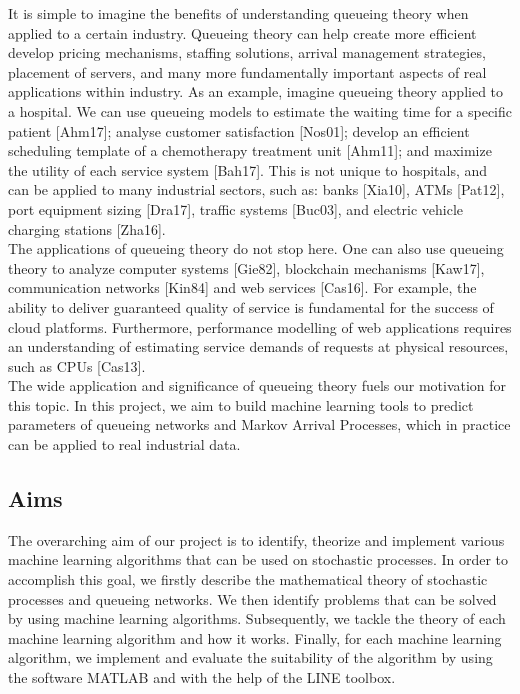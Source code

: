 \documentclass[a4paper,11pt,titlepage]{article}
\begin{document}
It is simple to imagine the benefits of understanding queueing theory when applied to a certain industry. Queueing theory can help create more efficient develop pricing mechanisms, staffing solutions, arrival management strategies, placement of servers, and many more fundamentally important aspects of real applications within industry. As an example, imagine queueing theory applied to a hospital. We can use queueing models to estimate the waiting time for a specific patient [Ahm17]; analyse customer satisfaction [Nos01]; develop an efficient scheduling template of a chemotherapy treatment unit [Ahm11]; and maximize the utility of each service system [Bah17]. This is not unique to hospitals, and can be applied to many industrial sectors, such as: banks [Xia10], ATMs [Pat12], port equipment sizing [Dra17], traffic systems [Buc03], and electric vehicle charging stations [Zha16]. \\

The applications of queueing theory do not stop here. One can also use queueing theory to analyze computer systems [Gie82], blockchain mechanisms [Kaw17], communication networks [Kin84] and web services [Cas16]. For example, the ability to deliver guaranteed quality of service is fundamental for the success of cloud platforms. Furthermore, performance modelling of web applications requires an understanding of estimating service demands of requests at physical resources, such as CPUs [Cas13].\\

The wide application and significance of queueing theory fuels our motivation for this topic. In this project, we aim to build machine learning tools to predict parameters of queueing networks and Markov Arrival Processes, which in practice can be applied to real industrial data. 

\subsection{Aims}

The overarching aim of our project is to identify, theorize and implement various machine learning algorithms that can be used on stochastic processes. In order to accomplish this goal, we firstly describe the mathematical theory of stochastic processes and queueing networks. We then identify problems that can be solved by using machine learning algorithms. Subsequently, we tackle the theory of each machine learning algorithm and how it works. Finally, for each machine learning algorithm, we implement and evaluate the suitability of the algorithm by using the software MATLAB and with the help of the LINE toolbox. \\
\end{document}

